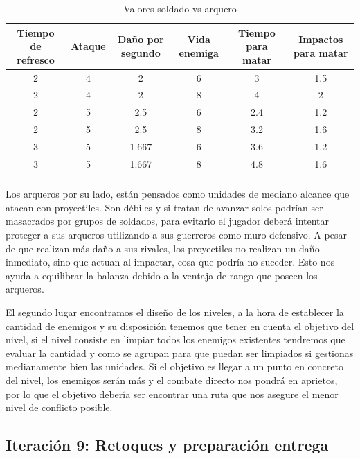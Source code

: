 \begin{longtable}[c]{|c|c|c|c|c|c|}
\hline
\multicolumn{1}{|m{1.8cm}|}{Tiempo de refresco} & \multicolumn{1}{m{1.2cm}|}{Ataque}             &
\multicolumn{1}{m{1.7cm}|}{Daño por segundo}   & \multicolumn{1}{m{1.4cm}|}{Vida enemiga}        &
\multicolumn{1}{m{1.2cm}|}{Tiempo para matar}  & \multicolumn{1}{m{1.45cm}|}{Impactos para matar}\\
\hline
\hline
\endhead
\multicolumn{1}{|S|}{2} & \multicolumn{1}{S|}{4} & \multicolumn{1}{S|}{2} & 
\multicolumn{1}{S|}{6}  & \multicolumn{1}{S|}{3} & \multicolumn{1}{S|}{1.5} \\
\hline
\multicolumn{1}{|S|}{2} & \multicolumn{1}{S|}{4} & \multicolumn{1}{S|}{2}   & 
\multicolumn{1}{S|}{8}  & \multicolumn{1}{S|}{4} & \multicolumn{1}{S|}{2} \\ 
\hline
\multicolumn{1}{|S|}{2} & \multicolumn{1}{S|}{5}   & \multicolumn{1}{S|}{2.5} & 
\multicolumn{1}{S|}{6}  & \multicolumn{1}{S|}{2.4} & \multicolumn{1}{S|}{1.2} \\ 
\hline
\multicolumn{1}{|S|}{2} & \multicolumn{1}{S|}{5}   & \multicolumn{1}{S|}{2.5} & 
\multicolumn{1}{S|}{8}  & \multicolumn{1}{S|}{3.2} & \multicolumn{1}{S|}{1.6} \\
\hline
\multicolumn{1}{|S|}{3} & \multicolumn{1}{S|}{5}   & \multicolumn{1}{S|}{1.667} & 
\multicolumn{1}{S|}{6}  & \multicolumn{1}{S|}{3.6} & \multicolumn{1}{S|}{1.2}   \\
\hline
\multicolumn{1}{|S|}{3} & \multicolumn{1}{S|}{5}   & \multicolumn{1}{S|}{1.667} & 
\multicolumn{1}{S|}{8}  & \multicolumn{1}{S|}{4.8} & \multicolumn{1}{S|}{1.6}   \\
\hline
\caption{Valores soldado vs arquero}
\end{longtable}

Los arqueros por su lado, están pensados como unidades de mediano alcance que atacan con proyectiles.
Son débiles y si tratan de avanzar solos podrían ser masacrados por grupos de soldados, para evitarlo 
el jugador deberá intentar proteger a sus arqueros utilizando a sus guerreros como muro defensivo. 
A pesar de que realizan más daño a sus rivales, los proyectiles no realizan un daño inmediato, sino que
actuan al impactar, cosa que podría no suceder. Esto nos ayuda a equilibrar la balanza debido a la ventaja
de rango que poseen los arqueros.

El segundo lugar encontramos el diseño de los niveles, a la hora de establecer la cantidad de enemigos
y su disposición tenemos que tener en cuenta el objetivo del nivel, si el nivel consiste en limpiar
todos los enemigos existentes tendremos que evaluar la cantidad y como se agrupan para que puedan
ser limpiados si gestionas medianamente bien las unidades. Si el objetivo es llegar a un punto en concreto
del nivel, los enemigos serán más y el combate directo nos pondrá en aprietos, por lo que el objetivo
debería ser encontrar una ruta que nos asegure el menor nivel de conflicto posible.

\subsection*{Iteración 9: Retoques y preparación entrega}




